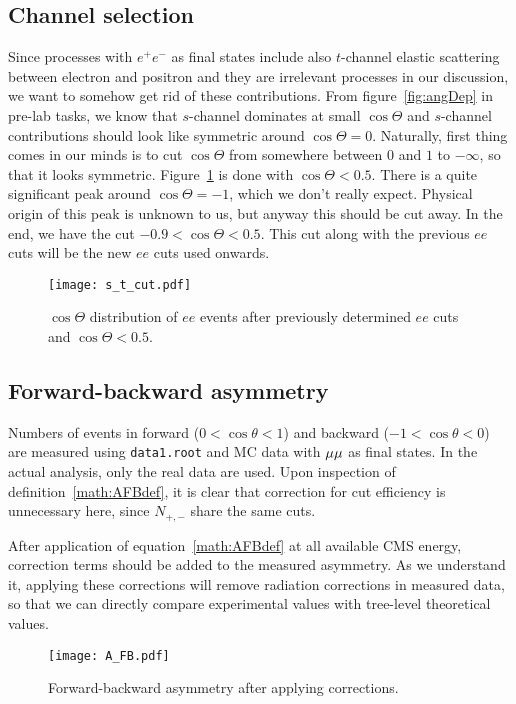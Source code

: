 \clearpage
\subsection{Channel selection} Since processes with $e^+ e^-$ as final states include also $t$-channel elastic scattering between electron and positron and they are irrelevant processes in our discussion, we want to somehow get rid of these contributions. From figure~\ref{fig:angDep} in pre-lab tasks, we know that $s$-channel dominates at small $\cos\Theta$ and $s$-channel contributions should look like symmetric around $\cos\Theta = 0$. Naturally, first thing comes in our minds is to cut $\cos\Theta$ from somewhere between $0$ and $1$ to $-\infty$, so that it looks symmetric. Figure~\ref{fig:s_t_cut} is done with $\cos\Theta < 0.5$. There is a quite significant peak around $\cos\Theta = -1$, which we don't really expect. Physical origin of this peak is unknown to us, but anyway this should be cut away. In the end, we have the cut $-0.9 < \cos\Theta < 0.5$. This cut along with the previous $ee$ cuts will be the new $ee$ cuts used onwards.
\begin{figure}[ht]
	\centering
	\texttt{[image: s\_t\_cut.pdf]}
	\caption{$\cos\Theta$ distribution of $ee$ events after previously determined $ee$ cuts and $\cos \Theta< 0.5$.}%
	\label{fig:s_t_cut}
\end{figure}

\subsection{Forward-backward asymmetry}
Numbers of events in forward ($0 <\cos\theta<1$) and backward ($-1<\cos\theta<0$) are measured using \verb|data1.root| and MC data with $\mu\mu$ as final states. In the actual analysis, only the real data are used. Upon inspection of definition~\ref{math:AFBdef}, it is clear that correction for cut efficiency is unnecessary here, since $N_{+,-}$ share the same cuts.

After application of equation~\ref{math:AFBdef} at all available CMS energy, correction terms should be added to the measured asymmetry. As we understand it, applying these corrections will remove radiation corrections in measured data, so that we can directly compare experimental values with tree-level theoretical values.
\begin{figure}[ht]
	\centering
	\texttt{[image: A\_FB.pdf]}
	\caption{Forward-backward asymmetry after applying corrections. }%
	\label{fig:A_FB}
\end{figure}

